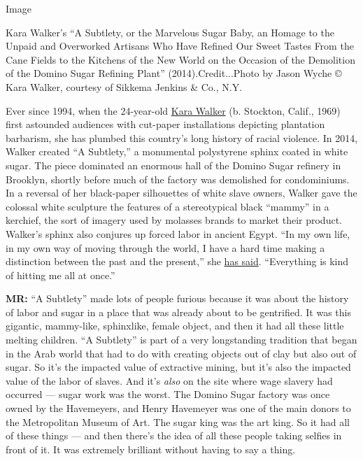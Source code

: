 Image

Kara Walker's ``A Subtlety, or the Marvelous Sugar Baby, an Homage to
the Unpaid and Overworked Artisans Who Have Refined Our Sweet Tastes
From the Cane Fields to the Kitchens of the New World on the Occasion of
the Demolition of the Domino Sugar Refining Plant''
(2014).Credit...Photo by Jason Wyche © Kara Walker, courtesy of Sikkema
Jenkins \& Co., N.Y.

Ever since 1994, when the 24-year-old
\href{https://www.nytimes.com/topic/person/kara-walker}{Kara Walker} (b.
Stockton, Calif., 1969) first astounded audiences with cut-paper
installations depicting plantation barbarism, she has plumbed this
country's long history of racial violence. In 2014, Walker created ``A
Subtlety,'' a monumental polystyrene sphinx coated in white sugar. The
piece dominated an enormous hall of the Domino Sugar refinery in
Brooklyn, shortly before much of the factory was demolished for
condominiums. In a reversal of her black-paper silhouettes of white
slave owners, Walker gave the colossal white sculpture the features of a
stereotypical black ``mammy'' in a kerchief, the sort of imagery used by
molasses brands to market their product. Walker's sphinx also conjures
up forced labor in ancient Egypt. ``In my own life, in my own way of
moving through the world, I have a hard time making a distinction
between the past and the present,'' she
\href{https://observer.com/2014/05/kara-walker-on-domino-demolition-it-makes-me-very-sad/}{has
said}. ``Everything is kind of hitting me all at once.''

\textbf{MR:} ``A Subtlety'' made lots of people furious because it was
about the history of labor and sugar in a place that was already about
to be gentrified. It was this gigantic, mammy-like, sphinxlike, female
object, and then it had all these little melting children. ``A
Subtlety'' is part of a very longstanding tradition that began in the
Arab world that had to do with creating objects out of clay but also out
of sugar. So it's the impacted value of extractive mining, but it's also
the impacted value of the labor of slaves. And it's \emph{also} on the
site where wage slavery had occurred --- sugar work was the worst. The
Domino Sugar factory was once owned by the Havemeyers, and Henry
Havemeyer was one of the main donors to the Metropolitan Museum of Art.
The sugar king was the art king. So it had all of these things --- and
then there's the idea of all these people taking selfies in front of it.
It was extremely brilliant without having to say a thing.

